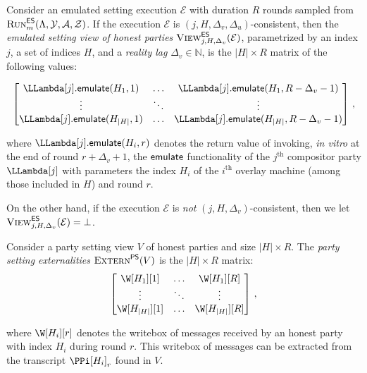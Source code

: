 \begin{definition}
  Consider an emulated setting execution $\mathcal{E}$ with duration $R$ rounds
  sampled from $\textsc{Run}^{\textsf{ES}}_m(\Lambda, \mathcal{Y}, \mathcal{A}, \mathcal{Z})$.
  If the execution $\mathcal{E}$ is $(j,H,\Delta_v,\Delta_u)$-consistent, then
  the \emph{emulated setting view of honest parties} $\textsc{View}^{\textsf{ES}}_{j,H,\Delta_v}(\mathcal{E})$,
  parametrized by an index $j$, a set of indices $H$, and a \emph{reality lag} $\Delta_v \in \mathbb{N}$,
  is the $|H| \times R$ matrix of the following values:

  \[
  \begin{bmatrix}
    \LLambda[j].\emulateMachine(H_1, 1) & \ldots & \LLambda[j].\emulateMachine(H_1, R - \Delta_v - 1)\\
                                 \vdots & \ddots & \vdots \\
    \LLambda[j].\emulateMachine(H_{|H|}, 1) & \ldots & \LLambda[j].\emulateMachine(H_{|H|}, R - \Delta_v - 1)
  \end{bmatrix}\,,
  \]

  where $\LLambda[j].\emulateMachine(H_i, r)$ denotes the return value of invoking,
  \emph{in vitro} at the end of round $r + \Delta_v + 1$,
  the $\textsf{emulate}$ functionality of the $j^\text{th}$ compositor party $\LLambda[j]$
  with parameters the index $H_i$ of the $i^\text{th}$ overlay machine (among those
  included in $H$) and round $r$.

  On the other hand, if the execution $\mathcal{E}$ is \emph{not} $(j,H,\Delta_v)$-consistent, then
  we let $\textsc{View}^{\textsf{ES}}_{j,H,\Delta_v}(\mathcal{E}) = \bot$.
\end{definition}

\begin{definition}
  Consider a party setting view $V$ of honest parties and size $|H| \times R$.
  The \emph{party setting externalities} $\textsc{Extern}^{\textsf{PS}}(V)$ is the $|H| \times R$ matrix:
  \[
  \begin{bmatrix}
    \W[H_1][1] &\ldots& \W[H_1][R]\\
         \vdots &\ddots& \vdots     \\
    \W[H_{|H|}][1] &\ldots& \W[H_{|H|}][R]
  \end{bmatrix}\,,
  \]

  where $\W[H_i][r]$ denotes the writebox of messages received by an honest party
  with index $H_i$ during round $r$. This writebox of messages can be extracted from
  the transcript $\PPi[H_i]_r$ found in $V$.
\end{definition}


